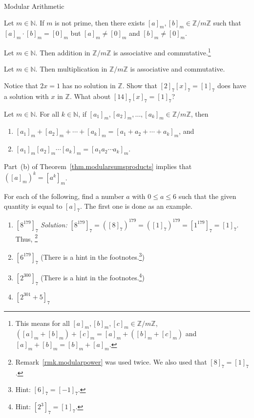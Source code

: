 \begin{section}{Modular Arithmetic}
\begin{theorem}
Let $m\in \mathbb{N}$. If $m$ is not prime, then there exists $[a]_m, [b]_m \in \mathbb{Z}/m\mathbb{Z}$ such that $[a]_m\cdot[b]_m = [0]_m$ but $[a]_m \neq [0]_m$ and $[b]_m \neq [0]_m$.
\end{theorem}

\begin{theorem}
Let $m\in \mathbb{N}$. Then addition in $\mathbb{Z}/m\mathbb{Z}$ is associative and commutative.\footnote{This means for all $[a]_m, [b]_m, [c]_m \in \mathbb{Z}/m\mathbb{Z}$, $([a]_m + [b]_m) + [c]_m = [a]_m + ([b]_m + [c]_m)$ and $[a]_m + [b]_m = [b]_m + [a]_m$.}
\end{theorem}

\begin{theorem}
Let $m\in \mathbb{N}$. Then multiplication in $\mathbb{Z}/m\mathbb{Z}$ is associative and commutative.
\end{theorem}

\begin{exercise}
Notice that $2x = 1$ has no solution in $\mathbb{Z}$. Show that  $[2]_7[x]_7 = [1]_7$ does have a solution with $x$ in $\mathbb{Z}$. What about $[14]_7[x]_7 = [1]_7$?
\end{exercise}

\begin{theorem}\label{thm.modularsumsproducts}
Let $m\in \mathbb{N}$.  For all $k\in \mathbb{N}$, if $[a_1]_m,[a_2]_m,\ldots, [a_k]_m \in \mathbb{Z}/m\mathbb{Z}$, then 
\begin{enumerate}[label=\textrm{(\alph*)}]
\item $[a_1]_m+[a_2]_m+\cdots+ [a_k]_m = [a_1 + a_2 +\cdots+ a_k]_m$, and
\item $[a_1]_m [a_2]_m \cdots  [a_k]_m = [a_1 a_2 \cdots a_k]_m$.
\end{enumerate}
\end{theorem}

\begin{remark}\label{rmk.modularpower}
Part~(b) of Theorem~\ref{thm.modularsumsproducts} implies that $([a]_m)^k = [a^k]_m$.
\end{remark}

\begin{exercise}
For each of the following, find a number $a$ with $0\le a \le 6$ such that the given quantity is equal to $[a]_7$. The first one is done as an example.
\begin{enumerate}[label=\textrm{(\alph*)}]
\item $[8^{179}]_7$
 \quad\textit{Solution:}  $[8^{179}]_7 = ([8]_7)^{179} =  ([1]_7)^{179} =  [1^{179}]_7 = [1]_7$. Thus,  \footnote{Remark~\ref{rmk.modularpower} was used twice. We also used that  $[8]_7 = [1]_7$.}
\item $[6^{179}]_7$ \quad(There is a hint in the footnotes.\footnote{Hint:  $[6]_7 = [-1]_7$.})
\item $[2^{300}]_7$ \quad(There is a hint in the footnotes.\footnote{Hint:  $[2^3]_7 = [1]_7$.})
\item $[2^{301} +5]_7$
\end{enumerate}
\end{exercise}


\end{section}
